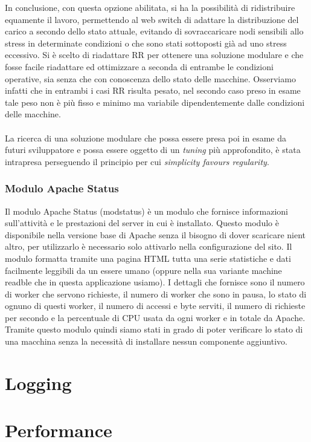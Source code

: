 \documentclass[italian]{tktltiki2}
\begin{document}
In conclusione, con questa opzione abilitata, si ha la possibilità di ridistribuire equamente il lavoro, permettendo al web switch di adattare la distribuzione del carico a secondo dello stato attuale, evitando di sovraccaricare nodi sensibili allo stress in determinate condizioni o che sono stati sottoposti già ad uno stress eccessivo. Si è scelto di riadattare RR per ottenere una soluzione modulare e che fosse facile riadattare ed ottimizzare a seconda di entrambe le condizioni operative, sia senza che con conoscenza dello stato delle macchine. Osserviamo infatti che in entrambi i casi RR risulta pesato, nel secondo caso preso in esame tale peso non è più fisso e minimo ma variabile dipendentemente dalle condizioni delle macchine.\\\\
La ricerca di una soluzione modulare che possa essere presa poi in esame da futuri sviluppatore e possa essere oggetto di un \emph{tuning} più approfondito, è stata intrapresa perseguendo il principio per cui \emph{simplicity favours regularity}.

\subsubsection{Modulo Apache Status} \label{ssec:apachestatus}
Il modulo Apache Status (modstatus) è un modulo che fornisce informazioni sull'attività e le prestazioni del server in cui è installato. Questo modulo è disponibile nella versione base di Apache senza il bisogno di dover scaricare nient altro, per utilizzarlo è necessario solo attivarlo nella configurazione del sito. Il modulo formatta tramite una pagina HTML tutta una serie statistiche e dati facilmente leggibili da un essere umano (oppure nella sua variante machine readble che in questa applicazione usiamo). I dettagli che fornisce sono il numero di worker che servono richieste, il numero di worker che sono in pausa, lo stato di ognuno di questi worker, il numero di accessi e byte serviti, il numero di richieste per secondo e la percentuale di CPU usata da ogni worker e in totale da Apache.
Tramite questo modulo quindi siamo stati in grado di poter verificare lo stato di una macchina senza la necessità di installare nessun componente aggiuntivo.


\newpage
\section{Logging}
\newpage
\section{Performance}
\end{document}
